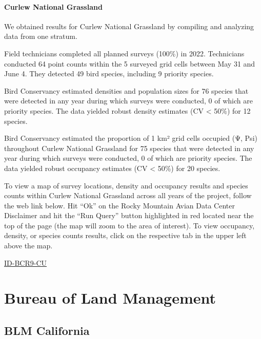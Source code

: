 \documentclass[
  letterpaper,
  DIV=11,
  numbers=noendperiod,
  oneside]{scrreprt}
\begin{document}
\hypertarget{curlew-national-grassland}{%
\subsubsection{Curlew National
Grassland}\label{curlew-national-grassland}}

We obtained results for Curlew National Grassland by compiling and
analyzing data from one stratum.

Field technicians completed all planned surveys (100\%) in 2022.
Technicians conducted 64 point counts within the 5 surveyed grid cells
between May 31 and June 4. They detected 49 bird species, including 9
priority species.

Bird Conservancy estimated densities and population sizes for 76 species
that were detected in any year during which surveys were conducted, 0 of
which are priority species. The data yielded robust density estimates
(CV \textless{} 50\%) for 12 species.

Bird Conservancy estimated the proportion of 1 km² grid cells occupied
(Ψ, Psi) throughout Curlew National Grassland for 75 species that were
detected in any year during which surveys were conducted, 0 of which are
priority species. The data yielded robust occupancy estimates (CV
\textless{} 50\%) for 20 species.

To view a map of survey locations, density and occupancy results and
species counts within Curlew National Grassland across all years of the
project, follow the web link below. Hit ``Ok'' on the Rocky Mountain
Avian Data Center Disclaimer and hit the ``Run Query'' button
highlighted in red located near the top of the page (the map will zoom
to the area of interest). To view occupancy, density, or species counts
results, click on the respective tab in the upper left above the map.

\href{http://www.rmbo.org/new_site/adc/QueryWindow.aspx\#N4IgzgLgTghhCuBbEAuABCAkgEQLQCEBhAJQE5dCBVdQ+KAGwFMB3NAOTgEsB7AOxnpoA4rDBh6MXgBMQAXyA===}{ID-BCR9-CU}

\hypertarget{bureau-of-land-management}{%
\chapter{Bureau of Land Management}\label{bureau-of-land-management}}

\hypertarget{blm-california}{%
\section{BLM California}\label{blm-california}}
\end{document}

